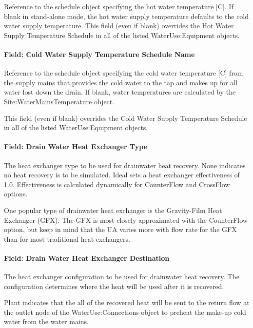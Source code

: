 Reference to the schedule object specifying the hot water temperature {[}C{]}. If blank in stand-alone mode, the hot water supply temperature defaults to the cold water supply temperature. This field (even if blank) overrides the Hot Water Supply Temperature Schedule in all of the listed WaterUse:Equipment objects.

\paragraph{Field: Cold Water Supply Temperature Schedule Name}\label{field-cold-water-supply-temperature-schedule-name-1-000}

Reference to the schedule object specifying the cold water temperature {[}C{]} from the supply mains that provides the cold water to the tap and makes up for all water lost down the drain. If blank, water temperatures are calculated by the Site:WaterMainsTemperature object.

This field (even if blank) overrides the Cold Water Supply Temperature Schedule in all of the listed WaterUse:Equipment objects.

\paragraph{Field: Drain Water Heat Exchanger Type}\label{field-drain-water-heat-exchanger-type}

The heat exchanger type to be used for drainwater heat recovery. None indicates no heat recovery is to be simulated. Ideal sets a heat exchanger effectiveness of 1.0. Effectiveness is calculated dynamically for CounterFlow and CrossFlow options.

One popular type of drainwater heat exchanger is the Gravity-Film Heat Exchanger (GFX). The GFX is most closely approximated with the CounterFlow option, but keep in mind that the UA varies more with flow rate for the GFX than for most traditional heat exchangers.

\paragraph{Field: Drain Water Heat Exchanger Destination}\label{field-drain-water-heat-exchanger-destination}

The heat exchanger configuration to be used for drainwater heat recovery. The configuration determines where the heat will be used after it is recovered.

Plant indicates that the all of the recovered heat will be sent to the return flow at the outlet node of the WaterUse:Connections object to preheat the make-up cold water from the water mains.

